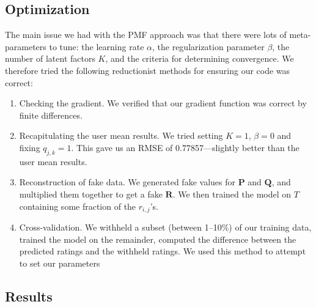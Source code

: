 \documentclass[11pt]{amsart}
\newcommand{\mat}[1]{\mathbf{#1}}
\begin{document}
\subsection{Optimization}
The main issue we had with the PMF approach was that there were lots of meta-parameters to tune: the learning rate $\alpha$, the regularization parameter $\beta$, the number of latent factors $K$, and the criteria for determining convergence. We therefore tried the following reductionist methods for ensuring our code was correct:

\begin{enumerate}
\item Checking the gradient. We verified that our gradient function was correct by finite differences.
\item Recapitulating the user mean results. We tried setting $K=1$, $\beta=0$ and fixing $q_{j,k} = 1$. This gave us an RMSE of 0.77857---slightly better than the user mean results.
\item Reconstruction of fake data. We generated fake values for $\mat{P}$ and $\mat{Q}$, and multiplied them together to get a fake $\mat{R}$. We then trained the model on $T$ containing some fraction of the $r_{i,j}$'s.  
\item Cross-validation. We withheld a subset (between 1--10\%) of our training data, trained the model on the remainder, computed the difference between the predicted ratings and the withheld ratings. We used this method to attempt to set our parameters
 
\end{enumerate}

\subsection{Results}
\end{document}
